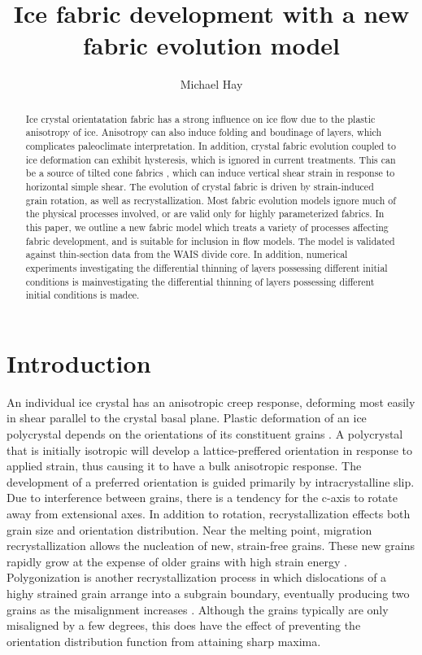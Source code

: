 \documentclass{article}
\title{Ice fabric development with a new fabric evolution model}
\author{Michael Hay}
\begin{document}
\maketitle

\begin{abstract}
Ice crystal orientatation fabric has a strong influence on ice flow due to the plastic anisotropy of ice. Anisotropy can also induce folding and boudinage of layers, which complicates paleoclimate interpretation. In addition, crystal fabric evolution coupled to ice deformation can exhibit hysteresis, which is ignored in current treatments. This can be a source of tilted cone fabrics \citep{throstur2002}, which can induce vertical shear strain in response to horizontal simple shear. The evolution of crystal fabric is driven by strain-induced grain rotation, as well as recrystallization. Most fabric evolution models ignore much of the physical processes involved, or are valid only for highly parameterized fabrics. In this paper, we outline a new fabric model which treats a variety of processes affecting fabric development, and is suitable for inclusion in flow models. The model is validated against thin-section data from the WAIS divide core. In addition, numerical experiments investigating the differential thinning of layers possessing different initial conditions is mainvestigating the differential thinning of layers possessing different initial conditions is madee. 
\end{abstract}

\section{Introduction}
An individual ice crystal has an anisotropic creep response, deforming most easily in shear parallel to the crystal basal plane. Plastic deformation of an ice polycrystal depends on the orientations of its constituent grains \citep{azuma94}. A polycrystal that is initially isotropic will develop a lattice-preffered orientation in response to applied strain, thus causing it to have a bulk anisotropic response. The development of a preferred orientation is guided primarily by intracrystalline slip. Due to interference between grains, there is a tendency for the c-axis to rotate away from extensional axes. In addition to rotation, recrystallization effects both grain size and orientation distribution. Near the melting point, migration recrystallization allows the nucleation of new, strain-free grains. These new grains rapidly grow at the expense of older grains with high strain energy \citep{duval1995}. Polygonization is another recrystallization process in which dislocations of a highy strained grain arrange into a subgrain boundary, eventually producing two grains as the misalignment increases \citep{alley97}. Although the grains typically are only misaligned by a few degrees, this does have the effect of preventing the orientation distribution function from attaining sharp maxima.
\end{document}
